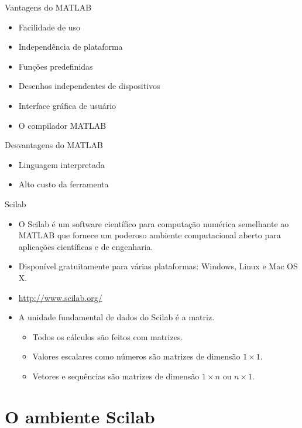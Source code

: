 \begin{frame}[allowframebreaks]{Vantagens do MATLAB}
  \begin{itemize}
    \item Facilidade de uso
    \item Independência de plataforma
    \item Funções predefinidas
    \item Desenhos independentes de dispositivos
    \item Interface gráfica de usuário
    \item O compilador MATLAB
  \end{itemize}
\end{frame}

\begin{frame}[allowframebreaks]{Desvantagens do MATLAB}
  \begin{itemize}
    \item Linguagem interpretada
    \item Alto custo da ferramenta
  \end{itemize}
\end{frame}

\begin{frame}[allowframebreaks]{Scilab}
  \begin{itemize}
    \item O \alert{Scilab} é um software científico para computação
    numérica semelhante ao \alert{MATLAB} que fornece um poderoso
    ambiente computacional \alert{aberto} para aplicações científicas e
    de engenharia.
    \item Disponível gratuitamente para várias \alert{plataformas}:
    Windows, Linux e Mac OS X.
    \item \url{http://www.scilab.org/}
    \item A unidade fundamental de dados do Scilab é a \alert{matriz}.
    \begin{itemize}
      \item Todos os cálculos são feitos com \alert{matrizes}.
      \item Valores escalares como números são matrizes de dimensão $1
      \times 1$.
      \item Vetores e sequências são matrizes de dimensão $1 \times n$
      ou $n \times 1$.
    \end{itemize}
  \end{itemize}
\end{frame}

\section{O ambiente Scilab}

